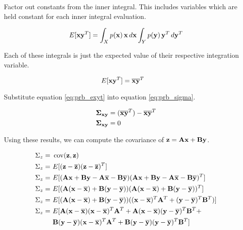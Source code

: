 Factor out constants from the inner integral. This includes variables which are
held constant for each inner integral evaluation.

\begin{equation*}
  E[\mathbf{x}\mathbf{y}^T] = \int_X p(\mathbf{x}) \,\mathbf{x} \,d\mathbf{x}
    \int_Y p(\mathbf{y}) \,\mathbf{y}^T \,d\mathbf{y}^T
\end{equation*}

Each of these integrals is just the expected value of their respective
integration variable.

\begin{align}
  E[\mathbf{x}\mathbf{y}^T] &= \overline{\mathbf{x}}\overline{\mathbf{y}}^T \label{eq:prb_exyt}
\end{align}

Substitute equation \eqref{eq:prb_exyt} into equation \eqref{eq:prb_sigma}.

\begin{align*}
  \mathbf{\Sigma}_{\mathbf{x}\mathbf{y}} &= (\overline{\mathbf{x}}\overline{\mathbf{y}}^T) -
    \overline{\mathbf{x}}\overline{\mathbf{y}}^T \\
  \mathbf{\Sigma}_{\mathbf{x}\mathbf{y}} &= 0
\end{align*}

Using these results, we can compute the covariance of
$\mathbf{z} = \mathbf{A}\mathbf{x} + \mathbf{B}\mathbf{y}$.

\begin{align*}
  \Sigma_z =~& \operatorname{cov}(\mathbf{z}, \mathbf{z}) \\
  \Sigma_z =~& E[(\mathbf{z} - \overline{\mathbf{z}})(\mathbf{z} - \overline{\mathbf{z}})^T] \\
  \Sigma_z =~& E[(\mathbf{A}\mathbf{x} + \mathbf{B}\mathbf{y} - \mathbf{A}\overline{\mathbf{x}} -
    \mathbf{B}\overline{\mathbf{y}})(\mathbf{A}\mathbf{x} + \mathbf{B}\mathbf{y} -
    \mathbf{A}\overline{\mathbf{x}} - \mathbf{B}\overline{\mathbf{y}})^T] \\
  \Sigma_z =~& E[(\mathbf{A}(\mathbf{x} - \overline{\mathbf{x}}) +
    \mathbf{B}(\mathbf{y} - \overline{\mathbf{y}}))
    (\mathbf{A}(\mathbf{x} - \overline{\mathbf{x}}) +
     \mathbf{B}(\mathbf{y} - \overline{\mathbf{y}}))^T] \\
  \Sigma_z =~& E[(\mathbf{A}(\mathbf{x} - \overline{\mathbf{x}}) +
    \mathbf{B}(\mathbf{y} - \overline{\mathbf{y}}))
    ((\mathbf{x} - \overline{\mathbf{x}})^T\mathbf{A}^T +
     (\mathbf{y} - \overline{\mathbf{y}})^T\mathbf{B}^T)] \\
  \Sigma_z =~& E[
    \mathbf{A}(\mathbf{x} - \overline{\mathbf{x}})(\mathbf{x} - \overline{\mathbf{x}})^T\mathbf{A}^T +
    \mathbf{A}(\mathbf{x} - \overline{\mathbf{x}})(\mathbf{y} - \overline{\mathbf{y}})^T\mathbf{B}^T + \\
    &\mathbf{B}(\mathbf{y} - \overline{\mathbf{y}})(\mathbf{x} - \overline{\mathbf{x}})^T\mathbf{A}^T +
    \mathbf{B}(\mathbf{y} - \overline{\mathbf{y}})(\mathbf{y} - \overline{\mathbf{y}})^T\mathbf{B}^T]
\end{align*}

